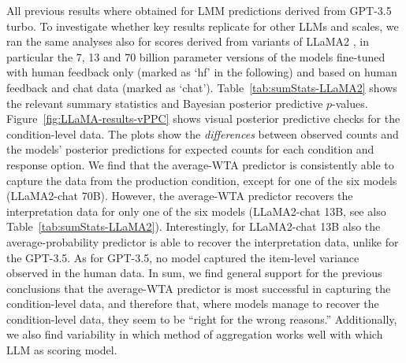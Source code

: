 \documentclass[fleqn]{article}
\begin{document}
All previous results where obtained for LMM predictions derived from GPT-3.5 turbo.
To investigate whether key results replicate for other LLMs and scales, we ran the same analyses also for scores derived from variants of LLaMA2 \citep{TouvronLavril2023:LLaMA:-Open-and}, in particular the 7, 13 and 70 billion parameter versions of the models fine-tuned with human feedback only (marked as `hf' in the following) and based on human feedback and chat data (marked as `chat').
Table~\ref{tab:sumStats-LLaMA2} shows the relevant summary statistics and Bayesian posterior predictive $p$-values.
Figure~\ref{fig:LLaMA-results-vPPC} shows visual posterior predictive checks for the condition-level data.
The plots show the \emph{differences} between observed counts and the models' posterior predictions for expected counts for each condition and response option.
We find that the average-WTA predictor is consistently able to capture the data from the production condition, except for one of the six models (LLaMA2-chat 70B).
However, the average-WTA predictor recovers the interpretation data for only one of the six models (LLaMA2-chat 13B, see also Table~\ref{tab:sumStats-LLaMA2}).
Interestingly, for LLaMA2-chat 13B also the average-probability predictor is able to recover the interpretation data, unlike for the GPT-3.5.
As for GPT-3.5, no model captured the item-level variance observed in the human data.
In sum, we find general support for the previous conclusions that the average-WTA predictor is most successful in capturing the condition-level data, and therefore that, where models manage to recover the condition-level data, they seem to be ``right for the wrong reasons.''
Additionally, we also find variability in which method of aggregation works well with which LLM as scoring model.
\end{document}
